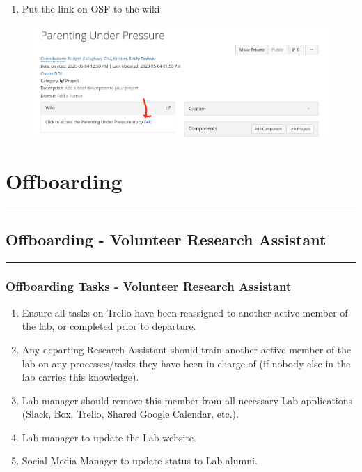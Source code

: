 \documentclass[]{book}
\providecommand{\tightlist}{%
  \setlength{\itemsep}{0pt}\setlength{\parskip}{0pt}}
\begin{document}
\begin{enumerate}
\def\labelenumi{\arabic{enumi}.}
\setcounter{enumi}{6}
\tightlist
\item
  Put the link on OSF to the wiki
\end{enumerate}

\begin{figure}
\centering
\includegraphics{images/research_protocols/wiki/7.png}
\caption{}
\end{figure}

\hypertarget{offboarding}{%
\chapter{Offboarding}\label{offboarding}}

\begin{center}\rule{0.5\linewidth}{0.5pt}\end{center}

\hypertarget{offboarding---volunteer-research-assistant}{%
\section{Offboarding - Volunteer Research Assistant}\label{offboarding---volunteer-research-assistant}}

\begin{center}\rule{0.5\linewidth}{0.5pt}\end{center}

\hypertarget{offboarding-tasks---volunteer-research-assistant}{%
\subsection{Offboarding Tasks - Volunteer Research Assistant}\label{offboarding-tasks---volunteer-research-assistant}}

\begin{enumerate}
\def\labelenumi{\arabic{enumi}.}
\tightlist
\item
  Ensure all tasks on Trello have been reassigned to another active member of the lab, or completed prior to departure.
\item
  Any departing Research Assistant should train another active member of the lab on any processes/tasks they have been in charge of (if nobody else in the lab carries this knowledge).
\item
  Lab manager should remove this member from all necessary Lab applications (Slack, Box, Trello, Shared Google Calendar, etc.).
\item
  Lab manager to update the Lab website.
\item
  Social Media Manager to update status to Lab alumni.
\end{enumerate}
\end{document}
